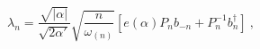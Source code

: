 \begin{equation}
\lambda_{n}= \frac{\sqrt{|\alpha|}}{\sqrt{2 \alpha'}} 
\sqrt{\frac{n}{\omega_{(n)}}} 
\left[e(\alpha) P_n b_{-n} +  P^{-1}_n b_n^\dagger \right]~,
\label{Plansv}
\end{equation}

